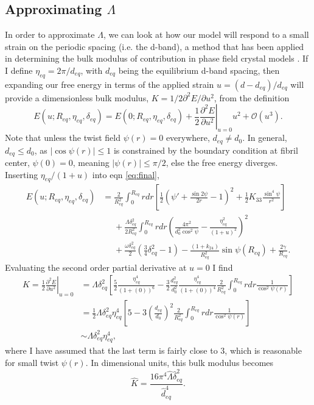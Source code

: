 \documentclass[12pt]{article}
\begin{document}
\subsection{Approximating $\Lambda$}
In order to approximate $\Lambda$, we can look at how our model will respond to a small strain on the periodic spacing (i.e. the d-band), a method that has been applied in determining the bulk modulus of contribution in phase field crystal models \cite{Elder:2004ct}. If I define $\eta_{eq}=2\pi/d_{eq}$, with $d_{eq}$ being the equilibrium d-band spacing, then expanding our free energy in terms of the applied strain $u=(d-d_{eq})/d_{eq}$ will provide a dimensionless bulk modulus, $K=1/2\partial^2E/\partial u^2$, from the definition
\begin{equation}\label{eq:strain_taylor}
E(u;R_{eq},\eta_{eq},\delta_{eq})=E(0;R_{eq},\eta_{eq},\delta_{eq})+\frac{1}{2}\left.\frac{\partial^2E}{\partial u^2}\right|_{u=0}\!\!\!\!\!\!\!\!\!u^2+\mathcal{O}(u^3).
\end{equation}
Note that unless the twist field $\psi(r)=0$ everywhere, $d_{eq}\neq d_0$. In general, $d_{eq}\leq d_0$, as $|\cos\psi(r)|\leq1$ is constrained by the boundary condition at fibril center, $\psi(0)=0$, meaning $|\psi(r)|\leq\pi/2$, else the free energy diverges.
Inserting $\eta_{eq}/(1+u)$ into eqn \ref{eq:final},
\begin{align}\label{eq:fe_strain}
E(u;R_{eq},\eta_{eq},\delta_{eq})&=\frac{2}{R_{eq}^2}\int_0^{R_{eq}}rdr\left[\frac{1}{2}\left(\psi'+\frac{\sin2\psi}{2r}-1\right)^2+\frac{1}{2}K_{33}\frac{\sin^4\psi}{r^2}\right]\nonumber\\
&\phantom{=}+\frac{\Lambda\delta_{eq}^2}{2R_{eq}^2}\int_0^{R_{eq}}rdr\left(\frac{4\pi^2}{d_0^2\cos^2\psi}-\frac{\eta_{eq}^2}{(1+u)^2}\right)^2\nonumber\\
&\phantom{=}+\frac{\omega\delta_{eq}^2}{2}\left(\frac{3}{4}\delta_{eq}^2-1\right)-\frac{(1+k_{24})}{R_{eq}^2}\sin\psi(R_{eq})+\frac{2\gamma}{R_{eq}}.
\end{align}
Evaluating the second order partial derivative at $u=0$ I find
\begin{align}
K=\frac{1}{2}\left.\frac{\partial^2E}{\partial u^2}\right|_{u=0} &=\Lambda\delta_{eq}^2\left[\frac{5}{2}\frac{\eta_{eq}^4}{(1+(0))^6}-\frac{3}{2}\frac{d_{eq}^2}{d_0^2}\frac{\eta_{eq}^4}{(1+(0))^4}\frac{2}{R_{eq}^2}\int_0^{R_{eq}}rdr\frac{1}{\cos^2\psi(r)}\right]\nonumber\\
&=\frac{1}{2}\Lambda\delta_{eq}^2\eta_{eq}^4\left[5-3\left(\frac{d_{eq}}{d_0}\right)^2\frac{2}{R_{eq}^2}\int_0^{R_{eq}}rdr\frac{1}{\cos^2\psi(r)}\right]\nonumber\\
&\sim\Lambda\delta_{eq}^2\eta_{eq}^4,
\end{align}
where I have assumed that the last term is fairly close to $3$, which is reasonable for small twist $\psi(r)$. In dimensional units, this bulk modulus becomes
\begin{equation}\label{eq:bulk_dimensional}
\hat{K}=\frac{16\pi^4\hat{\Lambda}\hat{\delta}_{eq}^2}{\hat{d}_{eq}^4}.
\end{equation}
\end{document}
